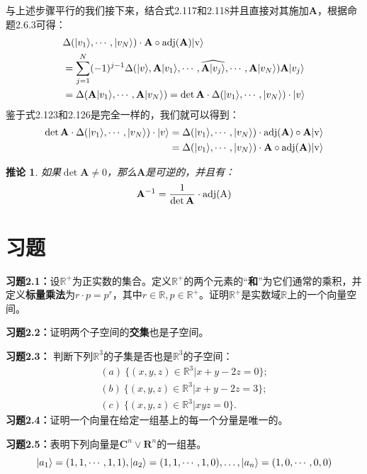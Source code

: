 \documentclass[mathserif,hyperref,UTF8,openany,b5paper]{ctexbook}
\newtheorem{cor}{推论}[section]
\begin{document}
与上述步骤平行的我们接下来，结合式2.117和2.118并且直接对其施加$\mathbf{A}$，根据命题2.6.3可得：
\begin{align}
    &\Delta(|v_1\rangle,\cdots,|v_N\rangle)\cdot\mathbf{A}\circ\rm{adj}(\mathbf{A})|v\rangle\\
    &=\sum_{j=1}^N(-1)^{j-1}\Delta(|v\rangle,\mathbf{A}|v_1\rangle,\cdots,\widehat{\mathbf{A}|v_j\rangle},\cdots,\mathbf{A}|v_N\rangle)\mathbf{A}|v_j\rangle\\
    &=\Delta(\mathbf{A}|v_1\rangle,\cdots,\mathbf{A}|v_N\rangle)=\det \mathbf{A}\cdot\Delta(|v_1\rangle,\cdots,|v_N\rangle)\cdot|v\rangle
\end{align}鉴于式2.123和2.126是完全一样的，我们就可以得到：
\begin{align}
\det \mathbf{A}\cdot\Delta(|v_1\rangle,\cdots,|v_N\rangle)\cdot|v\rangle &=\Delta(|v_1\rangle,\cdots,|v_N\rangle)\cdot\rm{adj}(\mathbf{A})\circ\mathbf{A}|v\rangle\notag\\
&=\Delta(|v_1\rangle,\cdots,|v_N\rangle)\cdot\mathbf{A}\circ\rm{adj}(\mathbf{A})|v\rangle
\end{align}
\begin{cor}
如果$\det \mathbf{A}\neq 0$，那么$\mathbf{A}$是可逆的，并且有：
\begin{equation}
\mathbf{A}^{-1}=\frac{1}{\det \mathbf{A}}\cdot\rm{adj}(A)
\end{equation}
\end{cor}
\section{习题}
\textbf{习题2.1：}设$\mathbb{R}^+$为正实数的集合。定义$\mathbb{R}^+$的两个元素的“\textbf{和}”为它们通常的乘积，并定义\textbf{标量乘法}为$r\cdot p = p^r$，其中$r\in \mathbb{R},p\in\mathbb{R}^+$。证明$\mathbb{R}^+$是实数域$\mathbb{R}$上的一个向量空间。

\textbf{习题2.2：}证明两个子空间的\textbf{交集}也是子空间。

\textbf{习题2.3：} 判断下列$\mathbb{R}^3$的子集是否也是$\mathbb{R}^3$的子空间：
\begin{align}
(a) \ \{(x,y,z)\in\mathbb{R}^3|x+y-2z=0\};\\
(b) \ \{(x,y,z)\in\mathbb{R}^3|x+y-2z=3\};\\
(c) \ \{(x,y,z)\in\mathbb{R}^3|xyz=0\}.
\end{align}
\textbf{习题2.4：}证明一个向量在给定一组基上的每一个分量是唯一的。

\textbf{习题2.5：}表明下列向量是$\mathbf{C}^n\lor\mathbf{R}^n$的一组基。
\begin{equation}
    |a_1\rangle=(1,1,\cdots,1,1),|a_2\rangle=(1,1,\cdots,1,0),\dots,|a_n\rangle=(1,0,\cdots,0,0)\notag
\end{equation}
\end{document}
